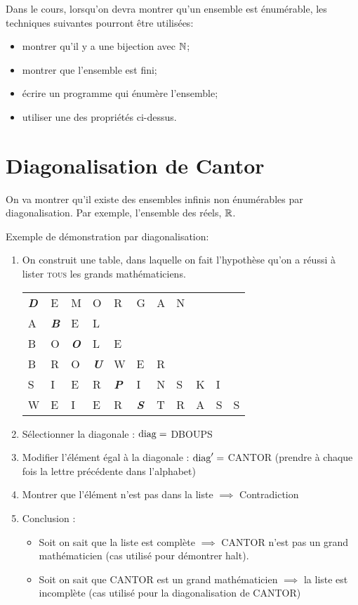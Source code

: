 Dans le cours, lorsqu'on devra montrer qu'un ensemble est énumérable,
les techniques suivantes pourront être utilisées:
\begin{itemize}
	\item montrer qu'il y a une bijection avec $\mathbb{N}$;
	\item montrer que l'ensemble est fini;
	\item écrire un programme qui énumère l'ensemble;
	\item utiliser une des propriétés ci-dessus.
\end{itemize}


\section{Diagonalisation de Cantor}
\label{sec:cantor}
On va montrer qu'il existe des ensembles infinis non énumérables par diagonalisation. Par exemple, l'ensemble des réels, $\mathbb{R}$.
\begin{myexem}
	Exemple de démonstration par diagonalisation:
	\begin{enumerate}
		\item On construit une table, dans laquelle on fait l'hypothèse qu'on a réussi à lister \textsc{tous} les grands mathématiciens.\\
			\begin{tabular}{lllllllllll}
				\emph{\textbf{D}}&E& M&O&R&G&A&N&&& \\
				A&\emph{\textbf{B}}&E&L&&&&&&&\\
				B&O&\emph{\textbf{O}}&L&E&&&&&&\\
				B&R&O&\emph{\textbf{U}}&W&E&R&&&&\\
				S&I&E&R&\emph{\textbf{P}}&I&N&S&K&I&\\
				W&E&I&E&R&\emph{\textbf{S}}&T&R&A&S&S\\
			\end{tabular}
		\item Sélectionner la diagonale : $\operatorname{diag} = $ DBOUPS
		\item Modifier l'élément égal à la diagonale : $\operatorname{diag}' =$ CANTOR (prendre à chaque fois la lettre précédente dans l'alphabet)
		\item Montrer que l'élément n'est pas dans la liste $\implies$ Contradiction
		\item Conclusion :
			\begin{itemize}
				\item Soit on sait que la liste est complète
					\subitem $ \implies$ CANTOR n'est pas un grand
					mathématicien (cas utilisé pour démontrer halt).
				\item Soit on sait que CANTOR est un grand
					mathématicien
					\subitem $ \implies$ la liste est incomplète (cas utilisé pour la diagonalisation de CANTOR)
			\end{itemize}
	\end{enumerate}
\end{myexem}

